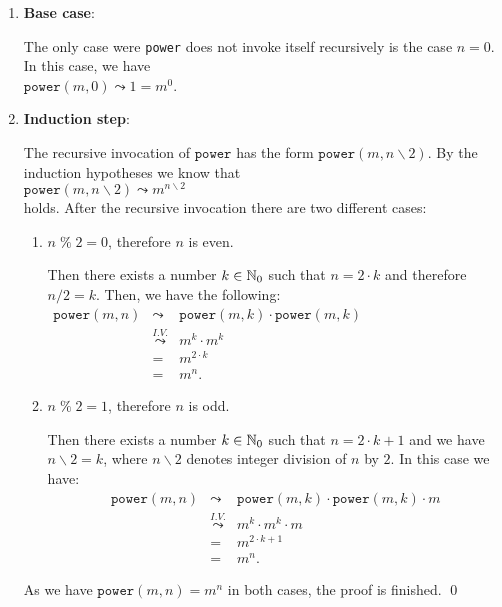 \begin{enumerate}
\item \textbf{Base case}:

      The only case were \texttt{power} does not invoke itself recursively is the case $n = 0$.  
      In this case, we have
      \\[0.2cm]
      \hspace*{1.3cm} 
      $\mathtt{power}(m,0) \leadsto 1 =  m^0$.
\item \textbf{Induction step}:

      The recursive invocation of $\mathtt{power}$ has the form
      $\mathtt{power}(m,n \backslash 2)$.  By the induction hypotheses we know that 
      \\[0.2cm]
      \hspace*{1.3cm}
      $\displaystyle \mathtt{power}(m,n \backslash 2) \leadsto m^{n \backslash 2}$ 
      \\[0.2cm]
      holds.  After the recursive invocation there are two different cases:
      \begin{enumerate}
      \item $n \;\texttt{\%}\; 2 = 0$, therefore $n$ is even.

            Then there exists a number $k \in {\mathbb N}_0$ such that $n = 2 \cdot k$ and therefore
            $n / 2 = k$.
            Then, we have the following:
            \\[0.2cm]
            \hspace*{1.3cm}
           $ 
            \begin{array}{lcl}
            \mathtt{power}(m,n) & \leadsto & \mathtt{power}(m,k) \cdot \mathtt{power}(m,k) \\[0.2cm]
                                & \stackrel{I.V.}{\leadsto} & m^k \cdot m^k  \\[0.2cm]
                                & = & m^{2\cdot k} \\[0.2cm]
                                & = & m^{n}.
            \end{array}
            $            
            \\[0.2cm]
      \item $n \;\texttt{\%}\; 2 = 1$, therefore $n$ is odd.

            Then there exists a number $k \in {\mathbb N}_0$ such that $n = 2 \cdot k + 1$ and we have
            $n \backslash 2 = k$, where $n \backslash 2$ denotes integer division of $n$ by $2$.
            In this case we have:
            \[ 
            \begin{array}{lcl}
            \mathtt{power}(m,n) & \leadsto & \mathtt{power}(m,k) \cdot \mathtt{power}(m,k) \cdot m  \\[0.2cm]
                                & \stackrel{I.V.}{\leadsto} & m^k \cdot m^k \cdot m  \\[0.2cm]
                                & = & m^{2\cdot k+1} \\[0.2cm]
                                & = & m^{n}.
            \end{array}
            \]
      \end{enumerate}
      As we have $\mathtt{power}(m,n) = m^n$ in both cases, the proof is finished.
      \qed
\end{enumerate}

